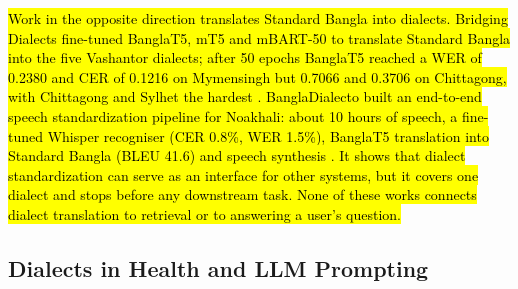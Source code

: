 \hl{Work in the opposite direction translates Standard Bangla into
dialects. Bridging Dialects fine-tuned BanglaT5, mT5 and mBART-50 to
translate Standard Bangla into the five Vashantor dialects; after 50
epochs BanglaT5 reached a WER of 0.2380 and CER of 0.1216 on Mymensingh
but 0.7066 and 0.3706 on Chittagong, with Chittagong and Sylhet the
hardest \cite{khandaker2024bridging}. BanglaDialecto built an end-to-end speech
standardization pipeline for Noakhali: about 10 hours of speech, a
fine-tuned Whisper recogniser (CER 0.8\%, WER 1.5\%), BanglaT5
translation into Standard Bangla (BLEU 41.6) and speech synthesis
\cite{samin2024bangladialecto}. It shows that dialect standardization can serve as an interface
for other systems, but it covers one dialect and stops before any
downstream task. None of these works connects dialect translation to
retrieval or to answering a user's question.}

\subsection{Dialects in Health and LLM Prompting}\label{dialects-in-health-and-llm-prompting}


